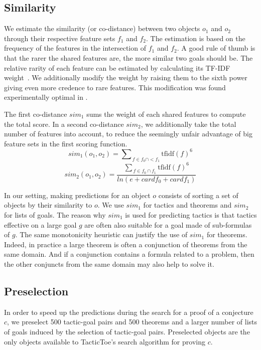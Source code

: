 \documentclass[runningheads,a4paper,draft]{svjour3}
\def\tactictoe{\textsf{TacticToe}\xspace}
\begin{document}
\subsection{Similarity}\label{sec:predictions}
We estimate the similarity (or co-distance) between two objects $o_1$ and $o_2$
through their respective feature sets $f_1$ and $f_2$.
The estimation is based on the frequency of the features in the intersection of
$f_1$ and $f_2$. A good rule of thumb is that the rarer the shared features
are, the more similar two goals should be. The relative rarity of each feature
can be estimated by calculating its TF-IDF weight~\cite{Jones72astatistical}.
We additionally modify the weight by raising them to the sixth power giving
even more credence
to rare features. This modification was found experimentally optimal in 
\cite{ckju-pxtp13}.

The first co-distance $sim_1$ sums the weight of each shared
features to compute the total score.
In a second co-distance $sim_2$, we additionally take
the total number of features into account, to reduce the seemingly unfair 
advantage of big
feature sets in the first scoring function.
\[sim_1 (o_1, o_2) = {\sum\nolimits_{\,f \in f_0 \cap
<f_1}{\text{tfidf}(f)^{6}}}\]
\[sim_2 (o_1, o_2) = \frac{{\sum\nolimits_{\,f \in f_0 \cap
f_1}{\text{tfidf}(f)^{6}}}}
{ln (e + \mathit{card} f_0 + \mathit{card} f_1)}\]

In our setting, making predictions for an object $o$ consists of sorting a set
of objects by their similarity to $o$. We use $sim_1$ for tactics and theorems
and $sim_2$ for lists of goals. The reason why $sim_1$ is used for
predicting tactics is that tactics effective on a large goal $g$ are often also
suitable for a goal made of sub-formulas of $g$. The same monotonicity
heuristic can justify the use of $sim_1$ for theorems. Indeed, in practice a
large theorem is often a conjunction of theorems from the same domain.
And if a conjunction contains a formula related to a problem, then the other
conjuncts from the same domain may also help to solve it.

\subsection{Preselection}\label{sec:dependencies}

In order to speed up the predictions during the search for a proof of a
conjecture $c$, we preselect 500 tactic-goal pairs and 500 theorems and a
larger number of lists of goals induced by the selection of tactic-goal pairs.
Preselected objects are the only objects available to \tactictoe's search 
algorithm for proving $c$. 
\end{document}
